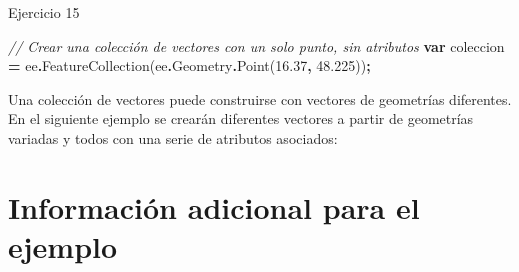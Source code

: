 \documentclass[
  12pt,
  letterpaper,
  twoside]{book}
\newenvironment{Shaded}{\begin{snugshade}}{\end{snugshade}}
\newcommand{\AttributeTok}[1]{\textcolor[rgb]{0.77,0.63,0.00}{#1}}
\newcommand{\CommentTok}[1]{\textcolor[rgb]{0.56,0.35,0.01}{\textit{#1}}}
\newcommand{\FloatTok}[1]{\textcolor[rgb]{0.00,0.00,0.81}{#1}}
\newcommand{\FunctionTok}[1]{\textcolor[rgb]{0.00,0.00,0.00}{#1}}
\newcommand{\KeywordTok}[1]{\textcolor[rgb]{0.13,0.29,0.53}{\textbf{#1}}}
\newcommand{\NormalTok}[1]{#1}
\newcommand{\OperatorTok}[1]{\textcolor[rgb]{0.81,0.36,0.00}{\textbf{#1}}}
\begin{document}
Ejercicio 15

\begin{Shaded}
\begin{Highlighting}[]
\CommentTok{// Crear una colección de vectores con un solo punto, sin atributos }
\KeywordTok{var}\NormalTok{ coleccion }\OperatorTok{=}\NormalTok{ ee}\OperatorTok{.}\FunctionTok{FeatureCollection}\NormalTok{(ee}\OperatorTok{.}\AttributeTok{Geometry}\OperatorTok{.}\FunctionTok{Point}\NormalTok{(}\FloatTok{16.37}\OperatorTok{,} \FloatTok{48.225}\NormalTok{))}\OperatorTok{;}
\end{Highlighting}
\end{Shaded}

Una colección de vectores puede construirse con vectores de geometrías diferentes. En el siguiente ejemplo se crearán diferentes vectores a partir de geometrías variadas y todos con una serie de atributos asociados:

\hypertarget{informaciuxf3n-adicional-para-el-ejemplo}{%
\section{Información adicional para el ejemplo}\label{informaciuxf3n-adicional-para-el-ejemplo}}
\end{document}
